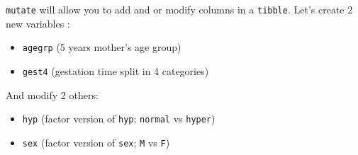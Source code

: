 \documentclass[
]{book}
\providecommand{\tightlist}{%
  \setlength{\itemsep}{0pt}\setlength{\parskip}{0pt}}
\begin{document}
\texttt{mutate} will allow you to add and or modify columns in a \texttt{tibble}.
Let's create 2 new variables :

\begin{itemize}
\tightlist
\item
  \texttt{agegrp} (5 years mother's age group)
\item
  \texttt{gest4} (gestation time split in 4 categories)
\end{itemize}

And modify 2 others:

\begin{itemize}
\tightlist
\item
  \texttt{hyp} (factor version of \texttt{hyp}; \texttt{normal} vs \texttt{hyper})
\item
  \texttt{sex} (factor version of \texttt{sex}; \texttt{M} vs \texttt{F})
\end{itemize}
\end{document}
